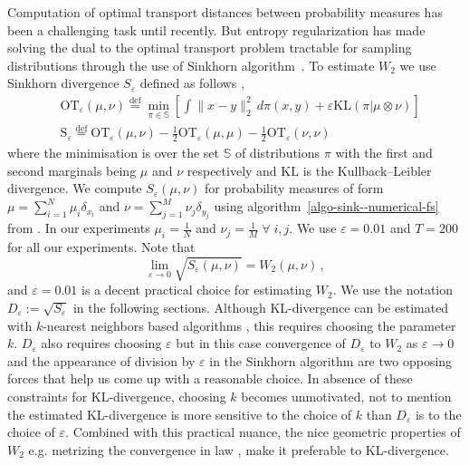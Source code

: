 Computation of optimal transport distances between probability measures has been a challenging task until recently. But entropy regularization has made solving the dual to the optimal transport problem tractable for sampling distributions through the use of Sinkhorn algorithm~\cite[and references therein]{genevay2019entropy}. To estimate $W_2$ we use Sinkhorn divergence $S_\varepsilon$ defined as follows \cite{feydy2019interpolating},
\begin{align}
    &\text{OT}_\varepsilon(\mu, \nu) \stackrel{\text{def}}{=} \min_{\pi \in \mathbb{S}}\left[\int\|x-y\|_2^2\,d\pi(x, y) + \varepsilon\text{KL}(\pi|\mu\otimes\nu)\right] \label{def-ot--numerical-fs}\\
    &\text{S}_\varepsilon \stackrel{\text{def}}{=} \text{OT}_\varepsilon(\mu, \nu) -\frac{1}{2}\text{OT}_\varepsilon(\mu, \mu)-\frac{1}{2}\text{OT}_\varepsilon(\nu, \nu) \label{def-sink--numerical-fs}
\end{align}
where the minimisation is over the set $\mathbb{S}$ of distributions $\pi$ with the first and second marginals being $\mu$ and $\nu$ respectively  
and $\text{KL}$ is the Kullback–Leibler divergence. We compute $S_\varepsilon(\mu, \nu)$ for probability measures of form $\mu=\sum_{i=1}^N\mu_i\delta_{x_i}$ and $\nu=\sum_{j=1}^M\nu_j\delta_{y_j}$ using algorithm~\ref{algo-sink--numerical-fs} from \cite{feydy2019interpolating}.
In our experiments $\mu_i=\frac{1}{N}$ and $\nu_j=\frac{1}{M}\; \forall\;i,j$. We use $\varepsilon=0.01$ and $T=200$ for all our experiments. { Note that \cite{genevay2019entropy, carlier2017convergence} 
\begin{equation}
    \lim_{\varepsilon\to0}\sqrt{S_\varepsilon(\mu, \nu)}= W_2(\mu, \nu) \,, \label{approx-w2--numerical-fs}
\end{equation}}
and $\varepsilon=0.01$ is a decent practical choice for estimating $W_2$. We use the notation $D_\varepsilon := \sqrt{S_\varepsilon}$ in the following sections. 
{
Although KL-divergence can be estimated with $k$-nearest neighbors based algorithms \cite{wang2009divergence}, this requires choosing the parameter $k$. $D_\varepsilon$ also requires choosing $\varepsilon$ but in this case convergence of $D_\varepsilon$ to $W_2$ as $\varepsilon\to 0$ and the appearance of division by $\varepsilon$ in the Sinkhorn algorithm are two opposing forces that help us come up with a reasonable choice. In absence of these constraints for KL-divergence, choosing $k$ becomes unmotivated, not to mention the estimated KL-divergence is more sensitive to the choice of $k$ than $D_\varepsilon$ is to the choice of $\varepsilon$. Combined with this practical nuance, the nice geometric  properties of $W_2$ e.g. metrizing the convergence in law \cite{feydy2019interpolating}, make it preferable to KL-divergence.}
